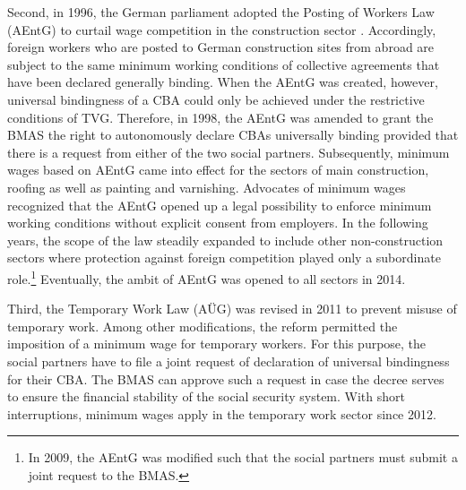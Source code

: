 \documentclass[11pt,oneside,reqno,xcolor=dvipsnames]{article} %
\begin{document}
Second, in 1996, the German parliament adopted the Posting of Workers Law (AEntG) to curtail wage competition in the construction sector \citep{Eichhorst2005}. Accordingly, foreign workers who are posted to German construction sites from abroad are subject to the same minimum working conditions of collective agreements that have been declared generally binding. When the AEntG was created, however, universal bindingness of a CBA could only be achieved under the restrictive conditions of TVG. Therefore, in 1998, the AEntG was amended to grant the BMAS the right to autonomously declare CBAs universally binding provided that there is a request from either of the two social partners. Subsequently, minimum wages based on AEntG came into effect for the sectors of main construction, roofing as well as painting and varnishing. Advocates of minimum wages recognized that the AEntG opened up a legal possibility to enforce minimum working conditions without explicit consent from employers. In the following years, the scope of the law steadily expanded to include other non-construction sectors where protection against foreign competition played only a subordinate role.\footnote{In 2009, the AEntG was modified such that the social partners must submit a joint request to the BMAS.} Eventually, the ambit of AEntG was opened to all sectors in 2014.

Third, the Temporary Work Law (AÜG) was revised in 2011 to prevent misuse of temporary work. Among other modifications, the reform permitted the imposition of a minimum wage for temporary workers. For this purpose, the social partners have to file a joint request of declaration of universal bindingness for their CBA. The BMAS can approve such a request in case the decree serves to ensure the financial stability of the social security system. With short interruptions, minimum wages apply in the temporary work sector since 2012.
\end{document}
